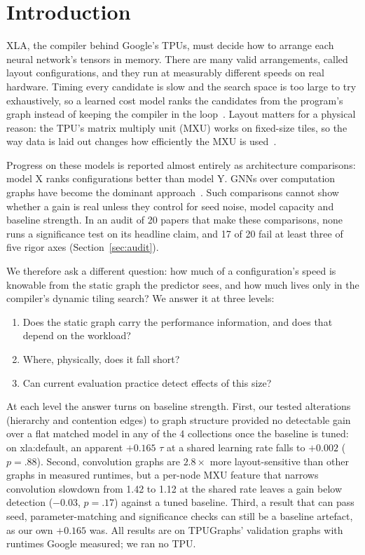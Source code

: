 \section{Introduction}
\label{sec:intro}

XLA, the compiler behind Google's TPUs, must decide how to arrange each neural network's tensors in
memory. There are many valid arrangements, called layout configurations, and they run at measurably
different speeds on real hardware. Timing every candidate is slow and the search space is too large to
try exhaustively, so a learned cost model ranks the candidates from the program's graph instead of
keeping the compiler in the loop~\cite{phothilimthana2023tpugraphs,kaufman2021learned}. Layout matters
for a physical reason: the TPU's matrix multiply unit (MXU) works on fixed-size tiles, so the way data
is laid out changes how efficiently the MXU is used~\cite{jouppi2020domainspecific}.

Progress on these models is reported almost entirely as architecture comparisons: model X ranks
configurations better than model Y. GNNs over computation graphs have become the dominant
approach~\cite{phothilimthana2023tpugraphs,kaufman2021learned,deng2024polynormer}. Such comparisons
cannot show whether a gain is real unless they control for seed noise, model capacity and baseline
strength. In an audit of 20 papers that make these comparisons, none runs a significance test on its
headline claim, and 17 of 20 fail at least three of five rigor axes (Section~\ref{sec:audit}).

We therefore ask a different question: how much of a configuration's speed is knowable from the static
graph the predictor sees, and how much lives only in the compiler's dynamic tiling search? We answer it
at three levels:
\begin{enumerate}
\item Does the static graph carry the performance information, and does that depend on the workload?
\item Where, physically, does it fall short?
\item Can current evaluation practice detect effects of this size?
\end{enumerate}

At each level the answer turns on baseline strength. First, our tested alterations (hierarchy and
contention edges) to graph structure provided no detectable gain over a flat matched model in any of
the 4 collections once the baseline is tuned: on xla:default, an apparent $+0.165$ $\tau$ at a
shared learning rate falls to $+0.002$ ($p = .88$). Second, convolution graphs are $2.8\times$ more
layout-sensitive than other graphs in measured runtimes, but a per-node MXU feature that narrows
convolution slowdown from 1.42 to 1.12 at the shared rate leaves a gain below detection ($-0.03$, $p
= .17$) against a tuned baseline. Third, a result that can pass seed, parameter-matching and
significance checks can still be a baseline artefact, as our own $+0.165$ was. All results are on
TPUGraphs' validation graphs with runtimes Google measured; we ran no TPU.

